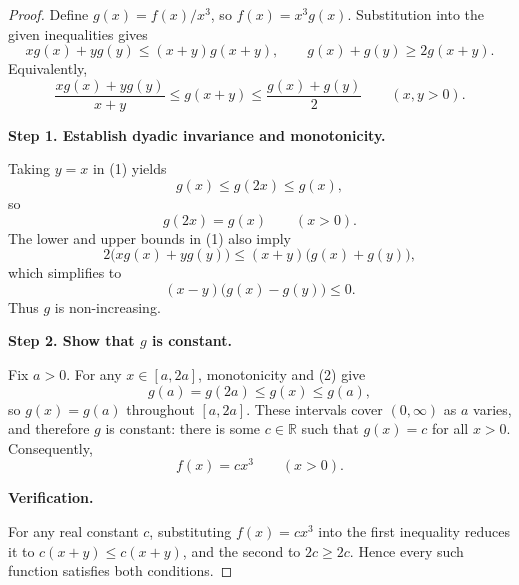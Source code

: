 
\begin{dlsummary}[title={\bfseries Solution 28. The Degree-Normalized Cubic Squeeze},breakable]

\begin{proof}
Define $g(x)=f(x)/x^3$, so $f(x)=x^3g(x)$. Substitution into the
given inequalities gives
\[
xg(x)+yg(y)\leq(x+y)g(x+y),
\qquad
g(x)+g(y)\geq2g(x+y).
\]
Equivalently,
\[
\frac{xg(x)+yg(y)}{x+y}
\leq g(x+y)\leq\frac{g(x)+g(y)}2
\qquad(x,y>0). \tag{1}
\]

\medskip
\noindent
\textbf{Step 1. Establish dyadic invariance and monotonicity.}

Taking $y=x$ in (1) yields
\[
g(x)\leq g(2x)\leq g(x),
\]
so
\[
g(2x)=g(x)\qquad(x>0). \tag{2}
\]
The lower and upper bounds in (1) also imply
\[
2\bigl(xg(x)+yg(y)\bigr)\leq(x+y)\bigl(g(x)+g(y)\bigr),
\]
which simplifies to
\[
(x-y)\bigl(g(x)-g(y)\bigr)\leq0.
\]
Thus $g$ is non-increasing.

\medskip
\noindent
\textbf{Step 2. Show that $g$ is constant.}

Fix $a>0$. For any $x\in[a,2a]$, monotonicity and (2) give
\[
g(a)=g(2a)\leq g(x)\leq g(a),
\]
so $g(x)=g(a)$ throughout $[a,2a]$. These intervals cover
$(0,\infty)$ as $a$ varies, and therefore $g$ is constant: there is
some $c\in\mathbb R$ such that $g(x)=c$ for all $x>0$.
Consequently,
\[
f(x)=cx^3\qquad(x>0).
\]

\medskip
\noindent
\textbf{Verification.}

For any real constant $c$, substituting $f(x)=cx^3$ into the first
inequality reduces it to
$c(x+y)\leq c(x+y)$, and the second to
$2c\geq2c$. Hence every such function satisfies both conditions.
\end{proof}

\end{dlsummary}